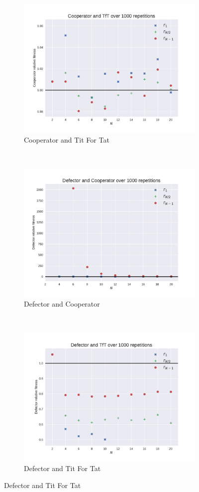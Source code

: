 \documentclass{article}
\begin{document}
\begin{figure}[!hbtp]
    \begin{subfigure}[t]{.3\textwidth}
        \centering
        \includegraphics[width=.8\textwidth]{./img/Cooperator_v_TfT_fitness.pdf}
        \caption{Cooperator and Tit For Tat}
    \end{subfigure}%
    ~
    \begin{subfigure}[t]{.3\textwidth}
        \centering
        \includegraphics[width=.8\textwidth]{./img/Defector_v_Cooperator_fitness.pdf}
        \caption{Defector and Cooperator}
    \end{subfigure}%
    ~
    \begin{subfigure}[t]{.3\textwidth}
        \centering
        \includegraphics[width=.8\textwidth]{./img/Defector_v_TfT_fitness.pdf}
        \caption{Defector and Tit For Tat}
    \end{subfigure}%


\end{figure}
\end{document}
